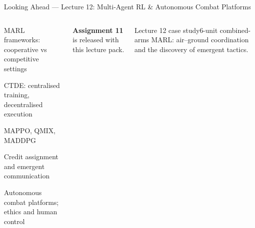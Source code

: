\documentclass[aspectratio=169,10pt,t]{beamer}
\begin{document}
\begin{frame}{Looking Ahead --- Lecture 12: Multi-Agent RL \& Autonomous Combat Platforms}
\begin{columns}[T]
\begin{tl}\item MARL frameworks: cooperative vs competitive settings\item CTDE: centralised training, decentralised execution\item MAPPO, QMIX, MADDPG\item Credit assignment and emergent communication\item Autonomous combat platforms; ethics and human control\end{tl}
\begin{ibox}\scriptsize\textbf{Assignment 11} is released with this lecture pack.\end{ibox}
\begin{cbox}{Lecture 12 case study}\scriptsize 6-unit combined-arms MARL: air--ground coordination and the discovery of emergent tactics.\end{cbox}
\end{columns}
\end{frame}
\end{document}
